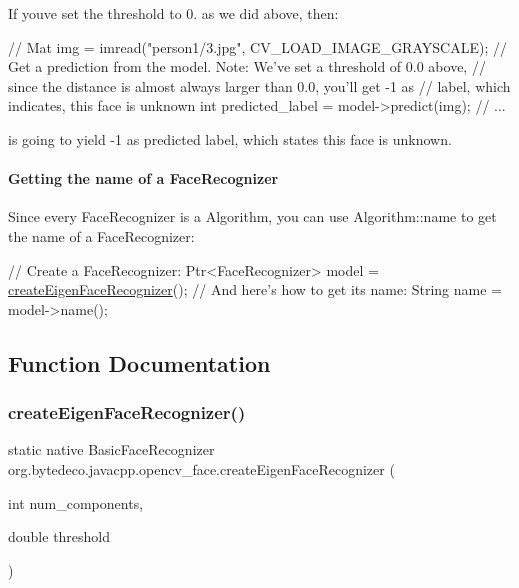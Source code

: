 If you\textquotesingle{}ve set the threshold to 0. as we did above, then\+: 


\begin{DoxyPre}
\begin{DoxyCode}
\textcolor{comment}{//}
Mat img = imread(\textcolor{stringliteral}{"person1/3.jpg"}, CV\_LOAD\_IMAGE\_GRAYSCALE);
\textcolor{comment}{// Get a prediction from the model. Note: We've set a threshold of 0.0 above,}
\textcolor{comment}{// since the distance is almost always larger than 0.0, you'll get -1 as}
\textcolor{comment}{// label, which indicates, this face is unknown}
\textcolor{keywordtype}{int} predicted\_label = model->predict(img);
\textcolor{comment}{// ...}
\end{DoxyCode}
 \end{DoxyPre}
 

is going to yield -\/1 as predicted label, which states this face is unknown. 

\paragraph*{Getting the name of a Face\+Recognizer}

Since every Face\+Recognizer is a Algorithm, you can use Algorithm\+::name to get the name of a Face\+Recognizer\+: 


\begin{DoxyPre}
\begin{DoxyCode}
\textcolor{comment}{// Create a FaceRecognizer:}
Ptr<FaceRecognizer> model = \hyperlink{group__face_ga6f3a56396530d46af3fba9ad04fc80cf}{createEigenFaceRecognizer}();
\textcolor{comment}{// And here's how to get its name:}
String name = model->name();
\end{DoxyCode}
 \end{DoxyPre}
 

\subsection{Function Documentation}
\mbox{\label{group__face_ga6f3a56396530d46af3fba9ad04fc80cf}} 
\subsubsection{\texorpdfstring{create\+Eigen\+Face\+Recognizer()}{createEigenFaceRecognizer()}}
{\footnotesize\ttfamily static native Basic\+Face\+Recognizer org.\+bytedeco.\+javacpp.\+opencv\+\_\+face.\+create\+Eigen\+Face\+Recognizer (\begin{DoxyParamCaption}\item[{int}]{num\+\_\+components,  }\item[{double}]{threshold }\end{DoxyParamCaption})\hspace{0.3cm}{\ttfamily [static]}}


